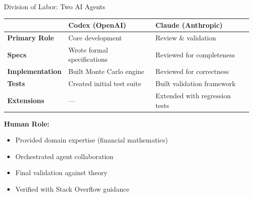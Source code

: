 \documentclass[aspectratio=169,11pt]{beamer}
\begin{document}
\begin{frame}{Division of Labor: Two AI Agents}
\begin{table}
\centering
\small
\begin{tabular}{p{3cm}p{4cm}p{4cm}}
\toprule
& \textbf{Codex (OpenAI)} & \textbf{Claude (Anthropic)} \\
\midrule
\textbf{Primary Role} & Core development & Review \& validation \\
\midrule
\textbf{Specs} & Wrote formal specifications & Reviewed for completeness \\
\textbf{Implementation} & Built Monte Carlo engine & Reviewed for correctness \\
\textbf{Tests} & Created initial test suite & Built validation framework \\
\textbf{Extensions} & --- & Extended with regression tests \\
\bottomrule
\end{tabular}
\end{table}

\textbf{Human Role:}
\begin{itemize}
    \item Provided domain expertise (financial mathematics)
    \item Orchestrated agent collaboration
    \item Final validation against theory
    \item Verified with Stack Overflow guidance
\end{itemize}
\end{frame}
\end{document}

